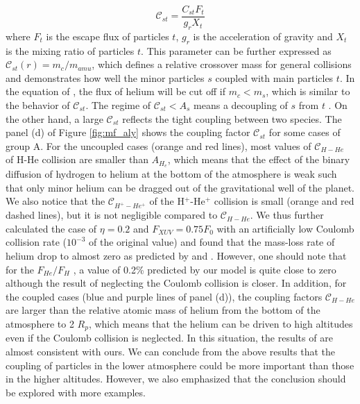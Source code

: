 \documentclass[journal, onecolumn]{aastex631}
\begin{document}
\begin{CJK*}{UTF8}{gbsn}
\begin{equation}\label{eq:couple_factor}
 \mathscr{C}_{st} = \frac{C_{st}F_{t}}{g_rX_t}
\end{equation}
where $F_t$ is the escape flux of particles $t$, $g_r$ is the acceleration of gravity and $X_t$ is the mixing ratio of particles $t$. This parameter can be further expressed as $\mathscr{C}_{st}(r)=m_c/m_{amu}$, which defines a relative crossover mass for general collisions and demonstrates how well the minor particles $s$ coupled with main particles $t$. In the equation of \cite{Hunten1987}, the flux of helium will be cut off if $m_{c}<m_{s}$, which is similar to the behavior of $\mathscr{C}_{st}$. The regime of $\mathscr{C}_{st}<A_{s}$ means a decoupling of $s$ from $t$ . On the other hand, a large $\mathscr{C}_{st}$ reflects the tight coupling between two species. The panel (d) of Figure \ref{fig:mf_aly} shows the coupling factor $\mathscr{C}_{st}$ for some cases of group A. For the uncoupled cases (orange and red lines), most values of $\mathscr{C}_{H-He}$ of H-He collision are smaller than $A_{H_{e}}$, which means that the effect of the binary diffusion of hydrogen to helium at the bottom of the atmosphere is weak such that only minor helium can be dragged out of the gravitational well of the planet. We also notice that the $\mathscr{C}_{H^{+}-He^{+}}$ of the H$^{+}$-He$^{+}$ collision is small (orange and red dashed lines), but it is not negligible compared to $\mathscr{C}_{H-He}$. We thus further calculated the case of $\eta=0.2$ and $F_{XUV}=0.75F_{0}$ with an artificially low Coulomb collision rate ($10^{-3}$ of the original value) and found that the mass-loss rate of helium drop to almost zero as predicted by \cite{Zahnle1986} and \cite{Hunten1987}. However, one should note that for the $F_{He}/F_H$ , a value of 0.2\% predicted by our model is quite close to zero although the result of neglecting the Coulomb collision is closer. In addition, for the coupled cases (blue and purple lines of panel (d)), the coupling factors $\mathscr{C}_{H-He}$ are larger than the relative atomic mass of helium from the bottom of the atmosphere to 2 $R_{p}$, which means that the helium can be driven to high altitudes even if the Coulomb collision is neglected. In this situation, the results of \cite{Hunten1987} are almost consistent with ours. We can conclude from the above results that the coupling of particles in the lower atmosphere could be more important than those in the higher altitudes. However, we also emphasized that the conclusion should be explored with more examples.


\end{CJK*}
\end{document}
